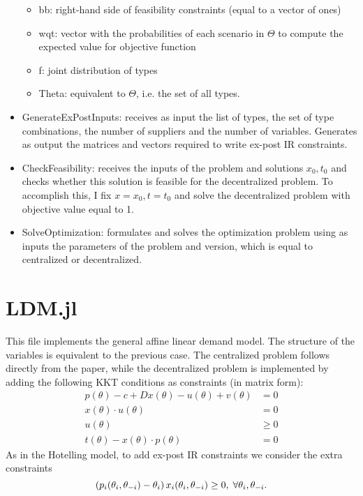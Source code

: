 \documentclass[11pt, oneside]{article}
\begin{document}
\begin{itemize}
\begin{itemize}
        \item bb: right-hand side of feasibility constraints (equal to a vector of ones)
        \item wqt: vector with the probabilities of each scenario in \(\Theta\) to compute the expected value for objective function
        \item f: joint distribution of types
        \item Theta: equivalent to \(\Theta\), i.e. the set of all types.
    \end{itemize}
    \item GenerateExPostInputs: receives as input the list of types, the set of type combinations, the number of suppliers and the number of variables. Generates as output the matrices and vectors required
    to write ex-post IR constraints.
    \item CheckFeasibility: receives the inputs of the problem and solutions
    \(x_0, t_0\) and checks whether this solution is feasible for the decentralized problem. To accomplish this, I fix \(x=x_0, t=t_0\) and solve the decentralized problem with objective value equal to 1.
    \item SolveOptimization: formulates and solves the optimization problem using as inputs the parameters of the problem and version, which is equal to centralized or decentralized.
\end{itemize}


\section{LDM.jl}
This file implements the general affine linear demand model. The structure of the variables is equivalent to the previous case. The centralized problem
follows directly from the paper, while the decentralized problem is implemented
by adding the following KKT conditions as constraints (in matrix form):
\[
\begin{split}
    p(\theta) - c + Dx(\theta) - u(\theta) + v(\theta) &= 0 \\
    x(\theta)\cdot u(\theta) &= 0 \\
    u(\theta) & \geq 0 \\
    t(\theta) - x(\theta)\cdot p(\theta) &= 0
\end{split}
\]
As in the Hotelling model, to add ex-post IR constraints we consider the extra constraints
\[
\left(p_i(\theta_i, \theta_{-i}) - \theta_i\right) x_i(\theta_i, \theta_{-i}) \geq 0, \; \forall \theta_i, \theta_{-i}.
\]
\end{document}
